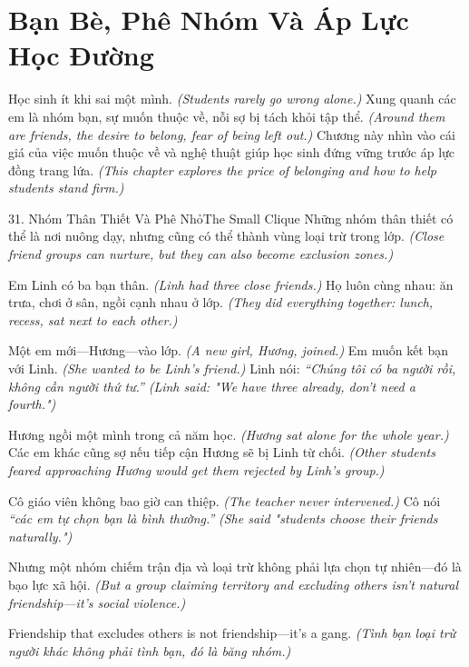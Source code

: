 \chapter{Bạn Bè, Phê Nhóm Và Áp Lực Học Đường}

\begin{leadbox}
Học sinh ít khi sai một mình.
\textit{(Students rarely go wrong alone.)}
Xung quanh các em là nhóm bạn, sự muốn thuộc về, nỗi sợ bị tách khỏi tập thể.
\textit{(Around them are friends, the desire to belong, fear of being left out.)}
Chương này nhìn vào cái giá của việc muốn thuộc về và nghệ thuật giúp học sinh đứng vững trước áp lực đồng trang lứa.
\textit{(This chapter explores the price of belonging and how to help students stand firm.)}
\end{leadbox}

\begin{truyen}{31. Nhóm Thân Thiết Và Phê Nhỏ}{The Small Clique}
Những nhóm thân thiết có thể là nơi nuông dạy, nhưng cũng có thể thành vùng loại trừ trong lớp.
\textit{(Close friend groups can nurture, but they can also become exclusion zones.)}

Em Linh có ba bạn thân.
\textit{(Linh had three close friends.)}
Họ luôn cùng nhau: ăn trưa, chơi ở sân, ngồi cạnh nhau ở lớp.
\textit{(They did everything together: lunch, recess, sat next to each other.)}

Một em mới—Hương—vào lớp.
\textit{(A new girl, Hương, joined.)}
Em muốn kết bạn với Linh.
\textit{(She wanted to be Linh's friend.)}
Linh nói: \textit{``Chúng tôi có ba người rồi, không cần người thứ tư.''}
\textit{(Linh said: "We have three already, don't need a fourth.")}

Hương ngồi một mình trong cả năm học.
\textit{(Hương sat alone for the whole year.)}
Các em khác cũng sợ nếu tiếp cận Hương sẽ bị Linh từ chối.
\textit{(Other students feared approaching Hương would get them rejected by Linh's group.)}

Cô giáo viên không bao giờ can thiệp.
\textit{(The teacher never intervened.)}
Cô nói \textit{``các em tự chọn bạn là bình thường.''} 
\textit{(She said "students choose their friends naturally.")}

Nhưng một nhóm chiếm trận địa và loại trừ không phải lựa chọn tự nhiên—đó là bạo lực xã hội.
\textit{(But a group claiming territory and excluding others isn't natural friendship—it's social violence.)}
\end{truyen}

\begin{ghinhoanh}
Friendship that excludes others is not friendship—it's a gang.
\textit{(Tình bạn loại trừ người khác không phải tình bạn, đó là băng nhóm.)}
\end{ghinhoanh}

